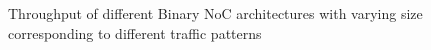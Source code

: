 \begin{figure}[t]
\centering    %
{}
\vspace{-3mm}
\caption{Throughput of different Binary NoC architectures with varying size corresponding to different traffic patterns}
\label{fig:tput}
\vspace{-5mm}
\end{figure}

